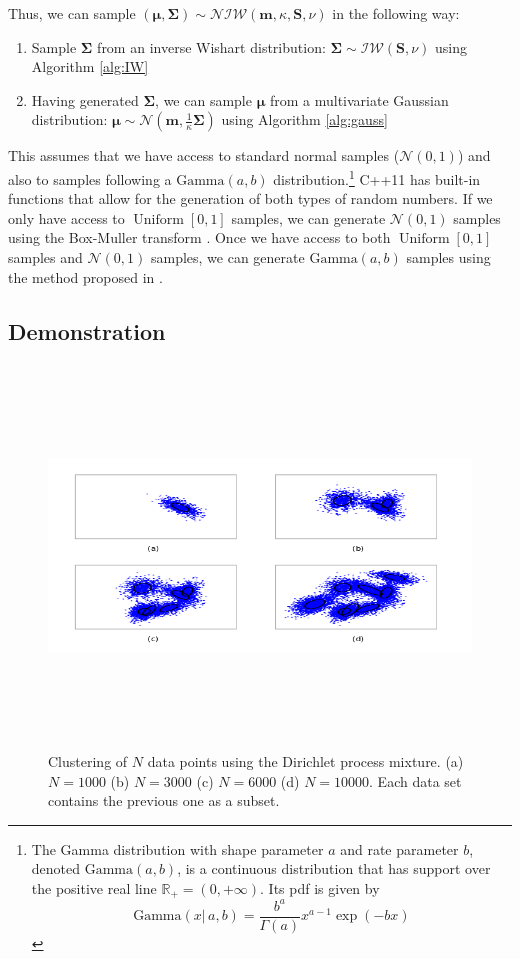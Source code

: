 \documentclass[final,3p,times,twocolumn]{elsarticle}
\DeclareMathOperator*{\Uniform}{Uniform}
\let\bs\boldsymbol
\begin{document}
Thus, we can sample $(\bs\mu,\bs\Sigma)\sim\mathcal{NIW}(\bs m,\kappa,\bs S,\nu)$ in the following way:
\begin{enumerate}
\item Sample $\bs\Sigma$ from an inverse Wishart distribution: $\bs\Sigma \sim \mathcal{IW}(\bs S,\nu)$ using Algorithm \ref{alg:IW}
\item Having generated $\bs\Sigma$, we can sample $\bs\mu$ from a multivariate Gaussian distribution: $\bs\mu \sim \mathcal{N}(\bs m,\frac{1}{\kappa}\bs\Sigma)$ using Algorithm \ref{alg:gauss}
\end{enumerate}
This assumes that we have access to standard normal samples ($\mathcal{N}(0,1)$) and also to samples following a $\mbox{Gamma}(a,b)$ distribution.\footnote{The Gamma distribution with shape parameter $a$ and rate parameter $b$, denoted $\mbox{Gamma}(a,b)$, is a continuous distribution that has support over the positive real line $\mathbb{R}_+ = (0,+\infty)$.
Its pdf is given by
\[
\mbox{Gamma}(x|\,a,b) = \frac{b^a}{\Gamma\left(a\right)} x^{a-1} \exp \left(-bx\right)
\]
}
C++11 has built-in functions that allow for the generation of both types of random numbers.
If we only have access to $\Uniform[0,1]$ samples, we can generate $\mathcal{N}(0,1)$ samples using the Box-Muller transform \cite{box1958}.
Once we have access to both $\Uniform[0,1]$ samples and $\mathcal{N}(0,1)$ samples, we can generate $\mbox{Gamma}(a,b)$ samples using the method proposed in \cite{marsaglia2000}.


\subsection{Demonstration}

\begin{figure}
\includegraphics[width=\textwidth,height=4in]{drawing.png}
\caption{Clustering of $N$ data points using the Dirichlet process mixture.
(a) $N=1000$ (b) $N=3000$ (c) $N=6000$ (d) $N=10000$.
Each data set contains the previous one as a subset.}
\label{fig:size}
\end{figure}
\end{document}
